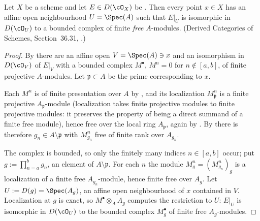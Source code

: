 \begin{lemma}
\label{lem:pc-perfect-local-normal-form}
Let $X$ be a scheme and let $E\in D(\cO_X)$ be
.  Then every point $x\in X$
has an affine open neighbourhood $U=\Spec(A)$ such that $E|_U$ is
isomorphic in $D(\cO_U)$ to a bounded complex of finite \emph{free}
$A$-modules.
(Derived Categories of Schemes, Section~36.31,
.)
\end{lemma}
\begin{proof}
By  there are an affine open
$V=\Spec(A)\ni x$ and an isomorphism in $D(\cO_V)$ of $E|_V$ with a
bounded complex $M^{\bullet}$, $M^n=0$ for $n\notin[a,b]$, of finite
projective $A$-modules.  Let $\mathfrak p\subset A$ be the prime
corresponding to $x$.

Each $M^n$ is of finite presentation over $A$ by
, and its localization
$M^n_{\mathfrak p}$ is a finite projective $A_{\mathfrak p}$-module
(localization takes finite projective modules to finite projective
modules: it preserves the property of being a direct summand of a
finite free module), hence free over the local ring
$A_{\mathfrak p}$, again by
.  By
 there is therefore
$g_n\in A\setminus\mathfrak p$ with $M^n_{g_n}$ free of finite rank
over $A_{g_n}$.

The complex is bounded, so only the finitely many indices
$n\in[a,b]$ occur; put $g:=\prod_{n=a}^{b}g_n$, an element of
$A\setminus\mathfrak p$.  For each $n$ the module
$M^n_g=(M^n_{g_n})_{g}$ is a localization of a finite free
$A_{g_n}$-module, hence finite free over $A_g$.  Let
$U:=D(g)=\Spec(A_g)$, an affine open neighbourhood of $x$ contained in
$V$.  Localization at $g$ is exact, so $M^{\bullet}\otimes_AA_g$
computes the restriction to $U$: $E|_U$ is isomorphic in $D(\cO_U)$ to
the bounded complex $M^{\bullet}_g$ of finite free $A_g$-modules.
\end{proof}

